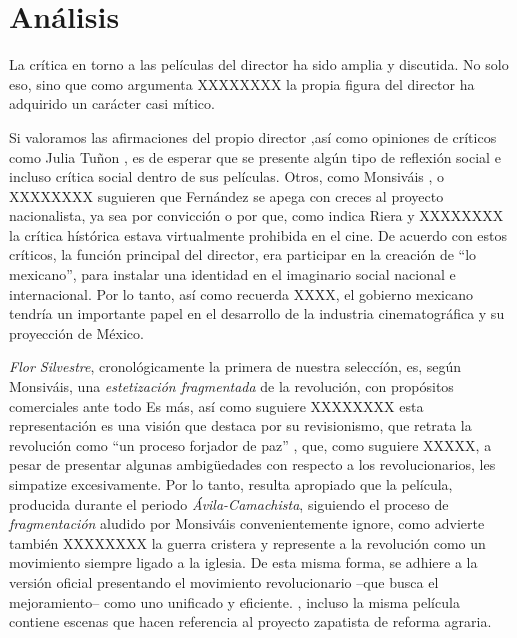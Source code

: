\section{Análisis}
La crítica en torno a las películas del director ha sido amplia y discutida. No solo eso, sino que como argumenta XXXXXXXX la propia figura del director ha adquirido un carácter casi mítico. %

Si valoramos las afirmaciones del propio director%
 ,así como opiniones de críticos como Julia Tuñon%
 , es de esperar que se presente algún tipo de reflexión social e incluso crítica social dentro de sus películas. 
Otros, como Monsiváis%
, o XXXXXXXX %
suguieren que Fernández se apega con creces 
al proyecto nacionalista, ya sea por convicción o por que, como indica Riera%
y  XXXXXXXX %
la crítica hístórica estava virtualmente prohibida en el cine. De acuerdo con estos críticos, la función principal del director, era participar en la creación de ``lo mexicano'', para instalar una identidad en el imaginario social nacional e internacional. %
Por lo tanto, así como recuerda XXXX, el gobierno mexicano tendría un importante papel en el desarrollo de la industria cinematográfica y su proyección de México. %

\emph{Flor Silvestre}, cronológicamente%
la primera de nuestra seleccíón, es, según Monsiváis, 
una \emph{estetización fragmentada}%
 de la revolución, con propósitos comerciales ante todo%
Es más, así como suguiere XXXXXXXX esta representación es una visión que destaca por su revisionismo,%
 que retrata la revolución como ``un proceso forjador de paz''%
, que, como suguiere XXXXX, a pesar de presentar algunas ambigüedades con respecto a los revolucionarios, les simpatize excesivamente.%
Por lo tanto, resulta apropiado que la película, producida durante el periodo \emph{Ávila-Camachista}, siguiendo el proceso de \emph{fragmentación} aludido por Monsiváis%
convenientemente ignore, como advierte también XXXXXXXX la guerra cristera y represente a la revolución como un movimiento siempre ligado a la iglesia.%
De esta misma forma, se adhiere a la versión oficial%
presentando  el movimiento revolucionario --que busca el mejoramiento-- como uno unificado y eficiente.%
, incluso la misma película contiene escenas que hacen referencia al proyecto zapatista de reforma agraria. %

